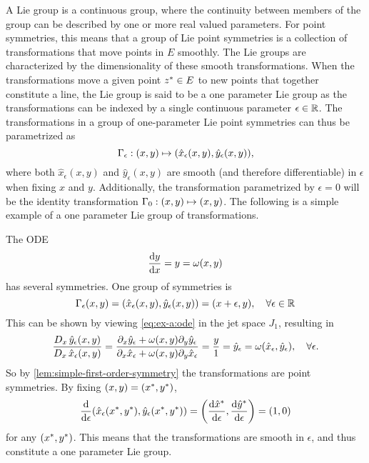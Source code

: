A Lie group is a continuous group, where the continuity between members of the group can be described by one or more real valued parameters.
For point symmetries, this means that a group of Lie point symmetries is a collection of transformations that move points in \(E\) smoothly.
The Lie groups are characterized by the dimensionality of these smooth transformations.
When the transformations move a given point \(z^* \in E\) to new points that together constitute a line, the Lie group is said to be a one parameter Lie group as the transformations can be indexed by a single continuous parameter \(\epsilon \in \mathbb{R}\).
The transformations in a group of one-parameter Lie point symmetries can thus be parametrized as
\begin{equation} \label{eq:1p-lie-point-symmetry}
  \Gamma_\epsilon: \pqty{x,y} \mapsto \pqty{\hat{x}_\epsilon(x,y), \hat{y}_\epsilon(x,y)},
\end{equation}
where both \(\hat{x}_\epsilon(x,y)\) and \(\hat{y}_\epsilon(x,y)\) are smooth (and therefore differentiable) in \(\epsilon\) when fixing \(x\) and \(y\).
Additionally, the transformation parametrized by \(\epsilon = 0\) will be the identity transformation \(\Gamma_0: \pqty{x,y} \mapsto \pqty{x,y}\).
The following is a simple example of a one parameter Lie group of transformations.
\begin{exmp}
  The ODE
  \begin{equation} \label{eq:ex-a:ode}
    \dv{y}{x} = y = \omega(x, y)
  \end{equation}
  has several symmetries.
  One group of symmetries is
  \begin{equation} \label{eq:ex-a:transformation}
    \Gamma_\epsilon(x,y) =
    \pqty{\hat{x}_\epsilon(x,y), \hat{y}_\epsilon(x,y)} =
    \pqty{x + \epsilon, y}, \quad
    \forall \epsilon \in \reals
  \end{equation}
  This can be shown by viewing \cref{eq:ex-a:ode} in the jet space \(J_1\), resulting in
  \begin{equation}
    \frac{D_{x}\, \hat{y}_\epsilon(x,y)}{D_{x}\, \hat{x}_\epsilon(x,y)} =
    \frac{\partial_x \hat{y}_\epsilon + \omega(x,y) \partial_y \hat{y}_\epsilon}{\partial_x \hat{x}_\epsilon + \omega(x,y) \partial_y \hat{x}_\epsilon} =
    \frac{y}{1} =
    \hat{y}_\epsilon =
    \omega(\hat{x}_\epsilon,\hat{y}_\epsilon), \quad
    \forall \epsilon.
  \end{equation}
  So by \cref{lem:simple-first-order-symmetry} the transformations are point symmetries.
  By fixing \(\pqty{x,y}=\pqty{\fixed{x},\fixed{y}}\),
  \begin{equation}
    \dv{\epsilon} \pqty{\hat{x}_\epsilon(\fixed{x},\fixed{y}), \hat{y}_\epsilon(\fixed{x},\fixed{y})} =
    \pqty{\dv{\fixed{\hat{x}}}{\epsilon}, \dv{\fixed{\hat{y}}}{\epsilon}} =
    \pqty{1,0}
  \end{equation}
  for any \(\pqty{\fixed{x},\fixed{y}}\).
  This means that the transformations are smooth in \(\epsilon\), and thus constitute a one parameter Lie group.
\end{exmp}
